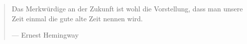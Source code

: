 \thispagestyle{empty}							%
\vspace*{\fill}									%
\begin{quote}	
	\centering									%
		
	Das Merkwürdige an der Zukunft ist wohl die Vorstellung, dass man unsere Zeit einmal die gute alte Zeit nennen wird. \par 
	--- Ernest Hemingway
\end{quote}
\vspace*{\fill}									%
\newpage